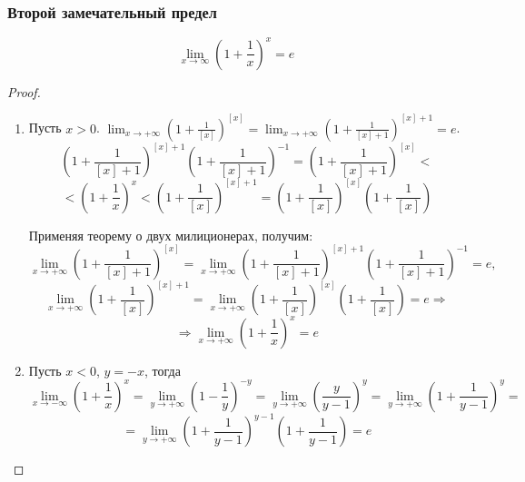 \subsubsection{Второй замечательный предел}
\begin{statement}
\begin{equation*}
\lim_{x \to \infty} \left( 1 + \frac1x \right)^x = e
\end{equation*}
\end{statement}
\begin{proof}
\begin{enumerate}
	\item Пусть $x > 0$.
	$\displaystyle \lim_{x \to +\infty} \left( 1 + \frac1{[x]} \right)^{[x]} =
	\lim_{x \to +\infty} \left( 1 + \frac1{[x] + 1} \right)^{[x] + 1} =
	e$.
	\begin{equation*}
	\left( 1 + \frac1{[x] + 1} \right)^{[x] + 1} \left( 1 + \frac1{[x] + 1} \right)^{-1} =
	\left( 1 + \frac1{[x] + 1} \right)^{[x]} <
	\end{equation*}
	\begin{equation*}
	< \left( 1 + \frac1x \right)^x <
	\left( 1 + \frac1{[x]} \right)^{[x] + 1} =
	\left( 1 + \frac1{[x]} \right)^{[x]} \left( 1 + \frac1{[x]} \right)
	\end{equation*}
	
	Применяя теорему о двух милиционерах, получим:
	\begin{equation*}
	\lim_{x \to +\infty} \left( 1 + \frac1{[x] + 1} \right)^{[x]} =
	\lim_{x \to +\infty} \left( 1 + \frac1{[x] + 1} \right)^{[x] + 1} \left( 1 + \frac1{[x] + 1} \right)^{-1} = e,
	\end{equation*}
	\begin{equation*}
	\lim_{x \to +\infty} \left( 1 + \frac1{[x]} \right)^{[x] + 1} =
	\lim_{x \to +\infty} \left( 1 + \frac1{[x]} \right)^{[x]} \left( 1 + \frac1{[x]} \right) = e \Rightarrow
	\end{equation*}
	\begin{equation*}
	\Rightarrow \lim_{x \to +\infty} \left( 1 + \frac1x \right)^x = e
	\end{equation*}
	
	\item Пусть $x < 0$, $y = -x$, тогда
	\begin{equation*}
	\lim_{x \to -\infty} \left( 1 + \frac1x \right)^x =
	\lim_{y \to +\infty} \left( 1 - \frac1y \right)^{-y} =
	\lim_{y \to +\infty} \left( \frac{y}{y - 1} \right)^y =
	\lim_{y \to +\infty} \left( 1 + \frac1{y - 1} \right)^y =
	\end{equation*}
	\begin{equation*}
	= \lim_{y \to +\infty} \left( 1 + \frac1{y - 1} \right)^{y-1} \left( 1 + \frac1{y - 1} \right) = e
	\end{equation*}
\end{enumerate}
\end{proof}

